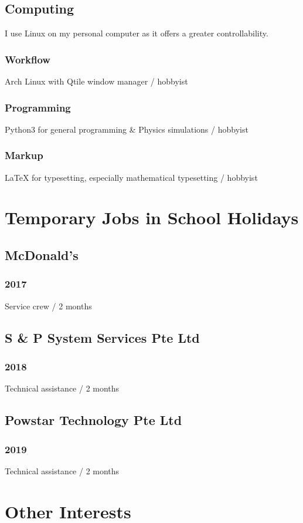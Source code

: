 \documentclass[a4paper]{article}
\begin{document}
\subsection{Computing}
I use Linux on my personal computer as it offers a greater controllability.
\subsubsection{Workflow}
Arch Linux with Qtile window manager / hobbyist 
\subsubsection{Programming}
Python3 for general programming \& Physics simulations / hobbyist 
\subsubsection{Markup}
{\LaTeX} for typesetting, especially mathematical typesetting / hobbyist 

\section{Temporary Jobs in School Holidays}
\subsection{McDonald's}
\subsubsection{2017}
Service crew / 2 months
\subsection{S \& P System Services Pte Ltd}
\subsubsection{2018}
Technical assistance / 2 months
\subsection{Powstar Technology Pte Ltd}
\subsubsection{2019}
Technical assistance / 2 months
\newpage
\section{Other Interests}
\end{document}
